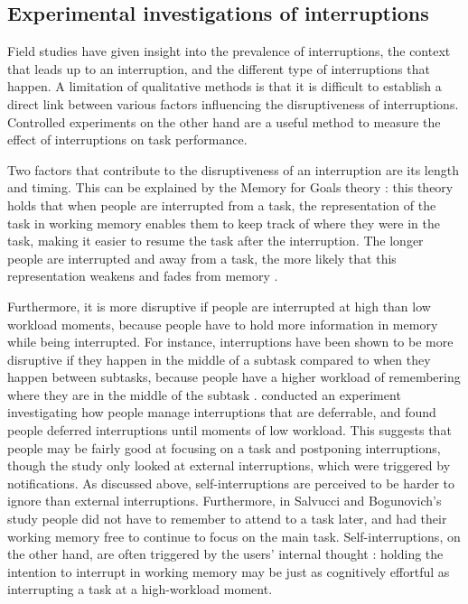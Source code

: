 \subsection{Experimental investigations of interruptions}
Field studies have given insight into the prevalence of interruptions, the context that leads up to an interruption, and the different type of interruptions that happen. A limitation of qualitative methods is that it is difficult to establish a direct link between various factors influencing the disruptiveness of interruptions. Controlled experiments on the other hand are a useful method to measure the effect of interruptions on task performance.

Two factors that contribute to the disruptiveness of an interruption are its length and timing. This can be explained by the Memory for Goals theory \citep{Altmann2002}: this theory holds that when people are interrupted from a task, the representation of the task in working memory enables them to keep track of where they were in the task, making it easier to resume the task after the interruption. The longer people are interrupted and away from a task, the more likely that this representation weakens and fades from memory \citep{Altmann2017, Monk2008}. 

Furthermore, it is more disruptive if people are interrupted at high than low workload moments, because people have to hold more information in memory while being interrupted. For instance, interruptions have been shown to be more disruptive if they happen in the middle of a subtask compared to when they happen between subtasks, because people have a higher workload of remembering where they are in the middle of the subtask \citep{Gould2013a, Iqbal2005}. \citet{Salvucci2010} conducted an experiment investigating how people manage interruptions that are deferrable, and found people deferred interruptions until moments of low workload. This suggests that people may be fairly good at focusing on a task and postponing interruptions, though the study only looked at external interruptions, which were triggered by notifications. As discussed above, self-interruptions are perceived to be harder to ignore than external interruptions. Furthermore, in Salvucci and Bogunovich's study people did not have to remember to attend to a task later, and had their working memory free to continue to focus on the main task. Self-interruptions, on the other hand, are often triggered by the users' internal thought \citep{Jin2009}: holding the intention to interrupt in working memory may be just as cognitively effortful as interrupting a task at a high-workload moment.


